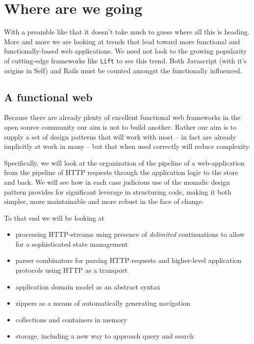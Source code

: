 \section{Where are we going}

With a preamble like that it doesn't take much to guess where all this
is heading. More and more we are looking at trends that lead toward
more functional and functionally-based web applications. We need not
look to the growing popularity of cutting-edge frameworks like
\texttt{Lift} to see this trend. Both Javascript (with it's origins in
Self) and Rails must be counted amongst the functionally influenced.

\subsection{A functional web}

Because there are already plenty of excellent functional web
frameworks in the open source community our aim is not to build
another. Rather our aim is to supply a set of design patterns that
will work with most -- in fact are already implicitly at work in many
-- but that when used correctly will reduce complexity.

Specifically, we will look at the organization of the pipeline of a
web-application from the pipeline of HTTP requests through the
application logic to the store and back. We will see how in each case
judicious use of the monadic design pattern provides for significant
leverage in structuring code, making it both simpler, more
maintainable and more robust in the face of change.

To that end we will be looking at

\begin{itemize}
  \item processing HTTP-streams using presence of \emph{delimited}
  continuations to allow for a sophisticated state management
  \item parser combinators for parsing HTTP-requests and higher-level
    application protocols using HTTP as a transport
  \item application domain model as an abstract syntax
  \item zippers as a means of automatically generating navigation
  \item collections and containers in memory
  \item storage, including a new way to approach query and search
\end{itemize}

